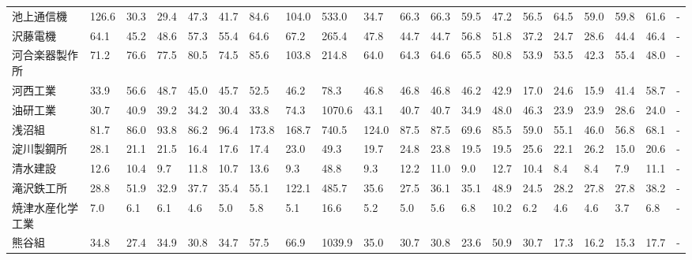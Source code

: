 \begin{tabular}{llllllllllllllllllll}
池上通信機           &  126.6 &   30.3 &      29.4 &      47.3 &       41.7 &    84.6 &   104.0 &    533.0 &    34.7 &    66.3 &   66.3 &   59.5 &    47.2 &    56.5 &    64.5 &   59.0 &   59.8 &    61.6 &      - \\
沢藤電機            &   64.1 &   45.2 &      48.6 &      57.3 &       55.4 &    64.6 &    67.2 &    265.4 &    47.8 &    44.7 &   44.7 &   56.8 &    51.8 &    37.2 &    24.7 &   28.6 &   44.4 &    46.4 &      - \\
河合楽器製作所         &   71.2 &   76.6 &      77.5 &      80.5 &       74.5 &    85.6 &   103.8 &    214.8 &    64.0 &    64.3 &   64.6 &   65.5 &    80.8 &    53.9 &    53.5 &   42.3 &   55.4 &    48.0 &      - \\
河西工業            &   33.9 &   56.6 &      48.7 &      45.0 &       45.7 &    52.5 &    46.2 &     78.3 &    46.8 &    46.8 &   46.8 &   46.2 &    42.9 &    17.0 &    24.6 &   15.9 &   41.4 &    58.7 &      - \\
油研工業            &   30.7 &   40.9 &      39.2 &      34.2 &       30.4 &    33.8 &    74.3 &   1070.6 &    43.1 &    40.7 &   40.7 &   34.9 &    48.0 &    46.3 &    23.9 &   23.9 &   28.6 &    24.0 &      - \\
浅沼組             &   81.7 &   86.0 &      93.8 &      86.2 &       96.4 &   173.8 &   168.7 &    740.5 &   124.0 &    87.5 &   87.5 &   69.6 &    85.5 &    59.0 &    55.1 &   46.0 &   56.8 &    68.1 &      - \\
淀川製鋼所           &   28.1 &   21.1 &      21.5 &      16.4 &       17.6 &    17.4 &    23.0 &     49.3 &    19.7 &    24.8 &   23.8 &   19.5 &    19.5 &    25.6 &    22.1 &   26.2 &   15.0 &    20.6 &      - \\
清水建設            &   12.6 &   10.4 &       9.7 &      11.8 &       10.7 &    13.6 &     9.3 &     48.8 &     9.3 &    12.2 &   11.0 &    9.0 &    12.7 &    10.4 &     8.4 &    8.4 &    7.9 &    11.1 &      - \\
滝沢鉄工所           &   28.8 &   51.9 &      32.9 &      37.7 &       35.4 &    55.1 &   122.1 &    485.7 &    35.6 &    27.5 &   36.1 &   35.1 &    48.9 &    24.5 &    28.2 &   27.8 &   27.8 &    38.2 &      - \\
焼津水産化学工業        &    7.0 &    6.1 &       6.1 &       4.6 &        5.0 &     5.8 &     5.1 &     16.6 &     5.2 &     5.0 &    5.6 &    6.8 &    10.2 &     6.2 &     4.6 &    4.6 &    3.7 &     6.8 &      - \\
熊谷組             &   34.8 &   27.4 &      34.9 &      30.8 &       34.7 &    57.5 &    66.9 &   1039.9 &    35.0 &    30.7 &   30.8 &   23.6 &    50.9 &    30.7 &    17.3 &   16.2 &   15.3 &    17.7 &      - \\

\end{tabular}
